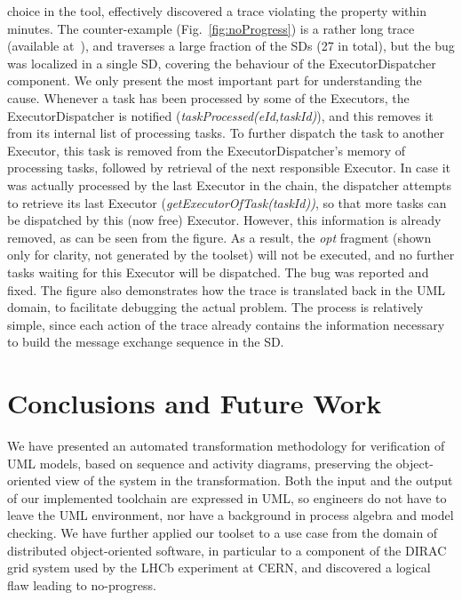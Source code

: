 \documentclass[letter]{llncs}
\newcommand{\secshrink}{\vspace{-.5cm}}
\newcommand{\secshrinkbegin}{\vspace{-.2cm}}
\begin{document}
choice in the tool,
effectively discovered
a trace violating the property within minutes. The counter-example (Fig.~\ref{fig:noProgress}) is a rather long trace (available at~\cite{repo:remenska}), 
and traverses a large fraction of the SDs (27 in total), but the bug was localized in a single SD, covering the behaviour of 
the ExecutorDispatcher component. 
We only present the most important part for understanding the cause. 
Whenever a task has been processed by some of 
the Executors, the ExecutorDispatcher is notified (\emph{taskProcessed(eId,taskId)}), and this removes it from its internal list 
of processing tasks. To further dispatch the task to another Executor, this task is removed from the ExecutorDispatcher's memory of processing tasks,
followed by retrieval of the next responsible Executor. In case it was actually processed by the last Executor in the chain, the
 dispatcher attempts to retrieve its last Executor (\emph{getExecutorOfTask(taskId))}, so that more tasks can be dispatched by 
this (now free) Executor. However, this information
is already removed, as can be seen from the figure. As a result, the \emph{opt} fragment (shown only for clarity, not generated by the toolset)
will not be executed, and no further tasks waiting for this Executor will be dispatched. The bug was reported and fixed.
The figure also demonstrates how the trace is translated back in the UML domain, 
to facilitate debugging the actual problem. The process is relatively simple, since each action of the trace already 
contains the information necessary 
to build the message exchange sequence in the SD.
\secshrink
\vspace{-1 pt}
\section{Conclusions and Future Work}
\label{sec:Conclusions}
\secshrinkbegin
\vspace{-2 pt}
We have presented an automated transformation methodology for verification of UML models, based on sequence and 
activity diagrams, preserving the object-oriented view of the system in the transformation. 
Both the input and the output of our implemented toolchain are expressed in UML, so engineers
do not have to leave the UML environment, nor have a background in process algebra and model checking. 
We have further
applied our toolset to a use case from the domain of distributed object-oriented software, in particular to a component
of the DIRAC grid system used by the LHCb experiment at CERN, and discovered a logical flaw leading to no-progress.
\end{document}
